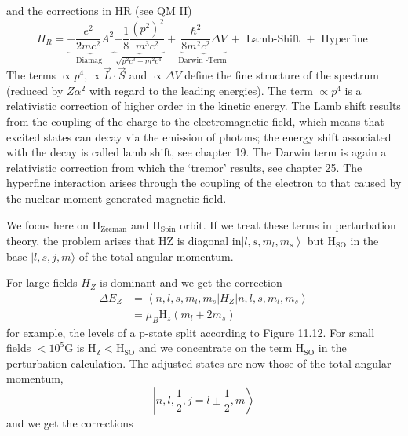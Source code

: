 and the corrections in HR (see QM II)
\begin{equation}
    H_{R}=\underbrace{-\frac{e^{2}}{2 m c^{2}} A^{2}}_{\text {Diamag }} \underbrace{-\frac{1}{8} \frac{\left(p^{2}\right)^{2}}{m^{3} c^{2}}}_{\sqrt{p^{2} c^{3}+m^{2} c^{4}}}+\underbrace{\frac{\hbar^{2}}{8 m^{2} c^{2}} \Delta V}_{\text {Darwin -Term }}+\text { Lamb-Shift }+\text { Hyperfine }
    \end{equation}
The terms $\propto p^{4}, \propto \vec{L} \cdot \vec{S}$ and $\propto \Delta V$ define the fine structure of the spectrum (reduced by $Z\alpha^2$ with regard to the leading energies). The term $\propto p^4$ is a relativistic correction of higher order in the kinetic energy. The Lamb shift results from the coupling of the charge to the electromagnetic field, which means that excited states can decay via the emission of photons; the energy shift associated with the decay is called lamb shift, see chapter 19. The Darwin term is again a relativistic correction from which the `tremor' results, see chapter 25. The hyperfine interaction arises through the coupling of the electron to that caused by the nuclear moment generated magnetic field.\par
We focus here on $\text{H}_{\text{Zeeman}}$ and $\text{H}_{\text{Spin}}$ orbit. If we treat these terms in perturbation theory, the problem arises that HZ is diagonal in$\left|l, s, m_{l}, m_{s}\right\rangle$ but $\text{H}_{\text{SO}}$ in the base $| l, s, j, m\rangle$ of the total angular momentum.\par
For large fields $H_Z$ is dominant and we get the correction
\begin{equation}
\begin{aligned} \Delta E_{Z} &=\left\langle n, l, s, m_{l}, m_{s}\left|H_{Z}\right| n, l, s, m_{l}, m_{s}\right\rangle \\ &=\mu_{B} \mathrm{H}_{z}\left(m_{l}+2 m_{s}\right) \end{aligned}
\end{equation}
for example, the levels of a p-state split according to Figure 11.12.
For small fields $<10^5$G is $\text{H}_{\text{Z}} <\text{H}_{\text{SO}}$ and we concentrate on the term $\text{H}_{\text{SO}}$ in the perturbation calculation. The adjusted states are now those of the total angular momentum,
\begin{equation}
    \left|n, l, \frac{1}{2}, j=l \pm \frac{1}{2}, m\right\rangle
    \end{equation}
and we get the corrections
